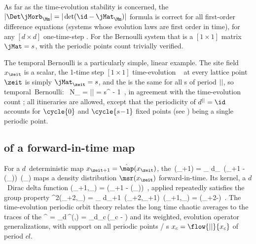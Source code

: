 As far as the time-evolution stability is concerned, the
$|\Det\jMorb_\Mm|=|\det (\id-\jMat_\Mm)|$ formula  is
correct for all first-order difference equations (systems whose evolution
laws are first order in time), for any $[d\times{d}]$ one-time-step
{\jacobianM}. For the Bernoulli system that is a $[1\!\times\!1]$ matrix
$\jMat=s$, with the periodic points count  trivially
verified.

The temporal {Bernoulli}  is a particularly simple, linear  example.
The site field $\ssp_\zeit$ is a scalar,
the 1-time step $[1\!\times\!1]$ time-evolution \jacobianM\
 at every lattice point $\zeit$ is simply
$\jMat_{\zeit}={s}$,
and
the {\jacobianOrb}
 is the same for all {\lattstate}s of period ${||}$,
so
\beq
\mbox{temporal {Bernoulli}: }\quad
N_\cl{} = |\Det\jMorb| = {s}^{\cl{}} - 1
\,,
in agreement with the time-evolution count ; all
itineraries are allowed, except that the periodicity of
$\shift^\cl{}=\id$ accounts for $\cycle{0}$ and
$\cycle{s\!-\!1}$ fixed points (see ) being a
single periodic point.



\subsection{{\HillDet} of a for\-ward-in-time map}
\label{s:LC21forwardHill}

For a $d$\dmn\ deterministic map $\ssp_{\zeit+1} = \hat{\map}(\ssp_{\zeit})$, the
{\FPoper}
\beq
     \Lop\,\msr(\ssp_{\zeit+1})
= \int_\pS\!\! d\ssp_{\zeit}\,
           \delta(\ssp_{\zeit+1} - \hat{\map}(\ssp_{\zeit}))\,
           \msr(\ssp_{\zeit})
maps a density distribution $\msr(\ssp_{\zeit})$ for\-ward-in-time.
Its kernel, a $d$\dmn\ Dirac delta function
\bea
\Lop(\ssp_{\zeit+1},\ssp_{\zeit})
    = \delta(\ssp_{\zeit+1} - \hat{\map}(\ssp_{\zeit}))
\,,
\eea
applied repeatedly satisfies the group property
\beq
\Lop^2(\ssp_{\zeit+2},\ssp_{\zeit})
    = \int_\pS\!\! d\ssp_{\zeit+1}\,
            \Lop(\ssp_{\zeit+2},\ssp_{\zeit+1})\,
            \Lop(\ssp_{\zeit+1},\ssp_{\zeit})
    = \delta(\ssp_{\zeit+2}-)
\,.
The time-evolution periodic orbit theory relates the
long time chaotic averages to the traces of the {\FPoper}
\beq
\tr\Lop^\cl{}
     = \int_\pS\!\!d\ssp\,\Lop^\cl{}(\ssp,\ssp)
     = \int_\pS\!\!d\ssp_{c}\,\delta(\ssp_{c} - )
\eeq
and its weighted, evolution operator generalizations, with support on all
periodic points / {\lattstate}s   $\ssp_{c}=\flow{\cl{}}{\ssp_c}$ of
period $cl{}$.

